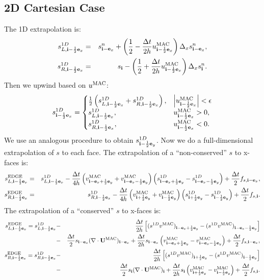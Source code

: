\subsection{2D Cartesian Case}
The 1D extrapolation is:
\begin{eqnarray}
s_{L,{\bf i}-\frac{1}{2}{\bf e}_x}^{1D} &=& s_{{\bf i}-{\bf e}_x}^n + \left(\frac{1}{2} - \frac{\Delta t}{2h}u_{{\bf i}-\frac{1}{2}{\bf e}_x}^{\rm MAC}\right)\Delta_x s_{{\bf i}-{\bf e}_x}^n, \label{varden s_L^1D}\\
s_{R,{\bf i}-\frac{1}{2}{\bf e}_x}^{1D} &=& s_{{\bf i}} - \left(\frac{1}{2} + \frac{\Delta t}{2h}u_{{\bf i}-\frac{1}{2}{\bf e}_x}^{\rm MAC}\right)\Delta_x s_{{\bf i}}^n. \label{varden s_R^1D}
\end{eqnarray}
Then we upwind based on $u^{\rm MAC}$:
\begin{equation}
s_{{\bf i}-\frac{1}{2}{\bf e}_x}^{1D} =
\begin{cases}
\frac{1}{2}\left(s_{L,{\bf i}-\frac{1}{2}{\bf e}_x}^{1D} + s_{R,{\bf i}-\frac{1}{2}{\bf e}_x}^{1D}\right), & \left|u^{\rm MAC}_{{\bf i}-\frac{1}{2}{\bf e}_x}\right| < \epsilon \\
s_{L,{\bf i}-\frac{1}{2}{\bf e}_x}^{1D}, & u^{\rm MAC}_{{\bf i}-\frac{1}{2}{\bf e}_x} > 0, \\
s_{R,{\bf i}-\frac{1}{2}{\bf e}_x}^{1D}, & u^{\rm MAC}_{{\bf i}-\frac{1}{2}{\bf e}_x} < 0. \\
\end{cases}
\end{equation}
We use an analogous procedure to obtain $s_{{\bf i}-\frac{1}{2}{\bf e}_y}^{1D}$.
Now we do a full-dimensional extrapolation of $s$ to each face.  The
extrapolation of a ``non-conserved'' $s$ to x-faces is:
\begin{eqnarray}
s_{L,{\bf i}-\frac{1}{2}{\bf e}_x}^{\rm EDGE} &=& s_{L,{\bf i}-\frac{1}{2}{\bf e}_x}^{1D} - \frac{\Delta t}{4h}\left(v_{{\bf i}-{\bf e}_x+\frac{1}{2}{\bf e}_y}^{\rm MAC}+v_{{\bf i}-{\bf e}_x-\frac{1}{2}{\bf e}_y}^{\rm MAC}\right)\left(s_{{\bf i}-{\bf e}_x+\frac{1}{2}{\bf e}_y}^{1D} - s_{{\bf i}-{\bf e}_x-\frac{1}{2}{\bf e}_y}^{1D}\right) + \frac{\Delta t}{2}f_{s,{\bf i}-{\bf e}_x}, \\
s_{R,{\bf i}-\frac{1}{2}{\bf e}_x}^{\rm EDGE} &=& s_{R,{\bf i}-\frac{1}{2}{\bf e}_x}^{1D} - \frac{\Delta t}{4h}\left(v_{{\bf i}+\frac{1}{2}{\bf e}_y}^{\rm MAC}+v_{{\bf i}-\frac{1}{2}{\bf e}_y}^{\rm MAC}\right)\left(s_{{\bf i}+\frac{1}{2}{\bf e}_y}^{1D} - s_{{\bf i}-\frac{1}{2}{\bf e}_y}^{1D}\right) + \frac{\Delta t}{2}f_{s,{\bf i}}.
\end{eqnarray}
The extrapolation of a ``conserved'' $s$ to x-faces is:
\begin{eqnarray}
s_{L,{\bf i}-\frac{1}{2}{\bf e}_x}^{\rm EDGE} = s_{L,{\bf i}-\frac{1}{2}{\bf e}_x}^{1D} &-& \frac{\Delta t}{2h}\left[(s^{1D} v^{\rm MAC})_{{\bf i}-{\bf e}_x+\frac{1}{2}{\bf e}_y} - (s^{1D} v^{\rm MAC})_{{\bf i}-{\bf e}_x-\frac{1}{2}{\bf e}_y}\right] \nonumber \\
&-& \frac{\Delta t}{2}s_{{\bf i}-{\bf e}_x}(\nabla\cdot{\bf U}^{\rm MAC})_{{\bf i}-{\bf e}_x} + \frac{\Delta t}{2h}s_{{\bf i}-{\bf e}_x}\left(v_{{\bf i}-{\bf e}_x+\frac{1}{2}{\bf e}_y}^{\rm MAC} - v_{{\bf i}-{\bf e}_x-\frac{1}{2}{\bf e}_y}^{\rm MAC}\right) + \frac{\Delta t}{2}f_{s,{\bf i}-{\bf e}_x}, \\
s_{R,{\bf i}-\frac{1}{2}{\bf e}_x}^{\rm EDGE} = s_{R,{\bf i}-\frac{1}{2}{\bf e}_x}^{1D} &-& \frac{\Delta t}{2h}\left[(s^{1D} v^{\rm MAC})_{{\bf i}+\frac{1}{2}{\bf e}_y} - (s^{1D} v^{\rm MAC})_{{\bf i}-\frac{1}{2}{\bf e}_y}\right] \nonumber \\
&-& \frac{\Delta t}{2}s_{{\bf i}}(\nabla\cdot{\bf U}^{\rm MAC})_{{\bf i}} + \frac{\Delta t}{2h}s_{{\bf i}}\left(v_{{\bf i}+\frac{1}{2}{\bf e}_y}^{\rm MAC} - v_{{\bf i}-\frac{1}{2}{\bf e}_y}^{\rm MAC}\right) + \frac{\Delta t}{2}f_{s,{\bf i}}.
\end{eqnarray}
